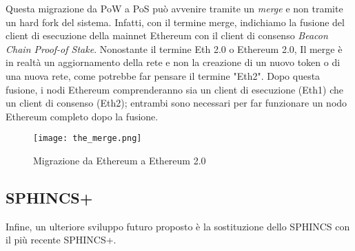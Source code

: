 Questa migrazione da PoW a PoS può avvenire tramite un \textit{merge} e non tramite un hard fork del sistema. Infatti, con il termine merge, indichiamo la fusione del client di esecuzione della mainnet Ethereum con il client di consenso \textit{Beacon Chain Proof-of Stake}. Nonostante il termine Eth 2.0 o Ethereum 2.0, Il merge è in realtà un aggiornamento della rete e non la creazione di un nuovo token o di una nuova rete, come potrebbe far pensare il termine "Eth2". Dopo questa fusione, i nodi Ethereum comprenderanno sia un client di esecuzione (Eth1) che un client di consenso (Eth2); entrambi sono necessari per far funzionare un nodo Ethereum completo dopo la fusione.

\begin{figure}[h]
  \centering
  \texttt{[image: the\_merge.png]}
  \caption{Migrazione da Ethereum a Ethereum 2.0}
  \label{fig:the_merge}
\end{figure}

\subsection{SPHINCS+}
Infine, un ulteriore sviluppo futuro proposto è la sostituzione dello SPHINCS con il più recente SPHINCS+.

